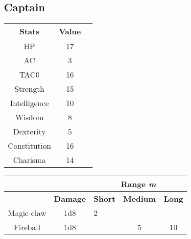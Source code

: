 \subsection{Captain}
\begin{table}[H]
  \centering
\begin{tabular}{|c|c|c|}
\hline
\rowcolor[HTML]{C0C0C0}
\textbf{Stats} & \textbf{Value } \\ \hline
HP & 17  \\ \hline
AC & 3 \\ \hline
TAC0 & 16 \\ \hline
Strength & 15  \\ \hline
Intelligence & 10 \\ \hline
Wisdom & 8 \\ \hline
Dexterity & 5  \\ \hline
Constitution & 16 \\ \hline
Charisma & 14 \\ \hline
\end{tabular}
\end{table}
\begin{table}[H]
\centering
 \begin{tabular}{lll|c|c|}
\cline{3-5}
 &  & \multicolumn{3}{c|}{\cellcolor[HTML]{C0C0C0}\textbf{Range \textit{m}}} \\ \hline
\rowcolor[HTML]{C0C0C0}
\multicolumn{1}{|l|}{\cellcolor[HTML]{C0C0C0}\textbf{Weapon}} & \textbf{Damage} &\multicolumn{1}{l|}{\cellcolor[HTML]{C0C0C0}\textbf{Short}} & \textbf{Medium} & \textbf{Long} \\ \hline
\multicolumn{1}{|c|}{Magic claw} & \multicolumn{1}{c|}{1d8}  & 2 &  &  \\ \hline
\multicolumn{1}{|c|}{Fireball} & \multicolumn{1}{c|}{1d8}    &  & 5 & 10 \\ \hline
\end{tabular}
  \end{table}
